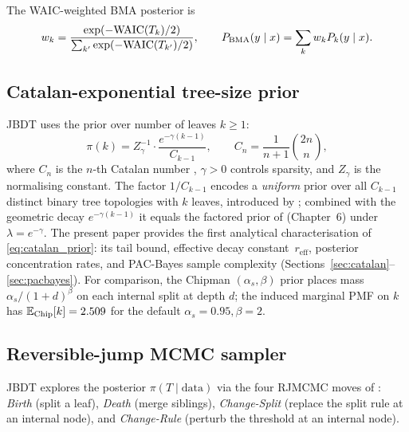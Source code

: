 \documentclass[ba]{imsart}
\theoremstyle{plain}
\theoremstyle{definition}
\theoremstyle{remark}
\newcommand{\waic}{\mathrm{WAIC}}
\newcommand{\Eop}{\mathbb{E}}
\newcommand{\reff}{r_{\mathrm{eff}}}
\begin{document}
The WAIC-weighted BMA posterior is
\begin{equation}
  w_k = \frac{\exp(-\waic(T_k)/2)}{\sum_{k'}\exp(-\waic(T_{k'})/2)},
  \qquad
  P_{\rm BMA}(y \mid x) = \sum_k w_k P_k(y \mid x).
  \label{eq:bma}
\end{equation}

\subsection{Catalan-exponential tree-size prior}
\label{sec:catalan_prior_def}

JBDT uses the prior over number of leaves $k \geq 1$:
\begin{equation}
  \pi(k) = Z_\gamma^{-1} \cdot \frac{e^{-\gamma(k-1)}}{C_{k-1}},
  \qquad
  C_n = \frac{1}{n+1}\binom{2n}{n},
  \label{eq:catalan_prior}
\end{equation}
where $C_n$ is the $n$-th Catalan number \citep{stanley2015,graham1994},
$\gamma > 0$ controls sparsity, and $Z_\gamma$ is the normalising constant.
The factor $1/C_{k-1}$ encodes a \emph{uniform} prior over all $C_{k-1}$ distinct
binary tree topologies with $k$ leaves, introduced by \citet{denison1998};
combined with the geometric decay $e^{-\gamma(k-1)}$ it equals the factored
prior of \citet{denison2002} (Chapter~6) under $\lambda = e^{-\gamma}$.
The present paper provides the first analytical characterisation of
\eqref{eq:catalan_prior}: its tail bound, effective decay constant~$\reff$,
posterior concentration rates, and PAC-Bayes sample complexity
(Sections~\ref{sec:catalan}--\ref{sec:pacbayes}).
For comparison, the Chipman $(\alpha_s,\beta)$ prior \citep{chipman1998}
places mass $\alpha_s/(1+d)^\beta$ on each internal split at depth $d$;
the induced marginal PMF on $k$ has $\Eop_{\rm Chip}[k] = 2.509$ for the
default $\alpha_s=0.95, \beta=2$.

\subsection{Reversible-jump MCMC sampler}

JBDT explores the posterior $\pi(T \mid \text{data})$ via the four RJMCMC moves
of \citet{green1995}: \emph{Birth} (split a leaf), \emph{Death} (merge siblings),
\emph{Change-Split} (replace the split rule at an internal node), and
\emph{Change-Rule} (perturb the threshold at an internal node).
\end{document}

